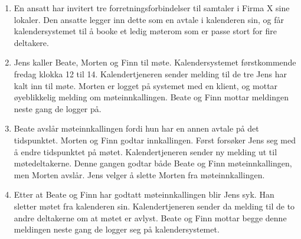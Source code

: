 \begin{enumerate}

\item
En ansatt har invitert tre forretningsforbindelser til samtaler i Firma X sine lokaler. Den ansatte legger inn dette som en avtale i kalenderen sin, og får kalendersystemet til å booke et ledig møterom som er passe stort for fire deltakere.

\item
Jens kaller Beate, Morten og Finn til møte. Kalendersystemet  førstkommende fredag klokka 12 til 14. Kalendertjeneren sender melding til de tre Jens har kalt inn til møte. Morten er logget på systemet med en klient, og mottar øyeblikkelig melding om møteinnkallingen. Beate og Finn mottar meldingen neste gang de logger på.

\item
Beate avslår møteinnkallingen fordi hun har en annen avtale på det tidspunktet. Morten og Finn godtar innkallingen. Først forsøker Jens seg med å endre tidspunktet på møtet. Kalendertjeneren sender ny melding ut til møtedeltakerne. Denne gangen godtar både Beate og Finn møteinnkallingen, men Morten avslår. Jens velger å slette Morten fra møteinnkallingen. 

\item
Etter at Beate og Finn har godtatt møteinnkallingen blir Jens syk. Han sletter møtet fra kalenderen sin. Kalendertjeneren sender da melding til de to andre deltakerne om at møtet er avlyst. Beate og Finn mottar begge denne meldingen neste gang de logger seg på kalendersystemet.

\end{enumerate}
